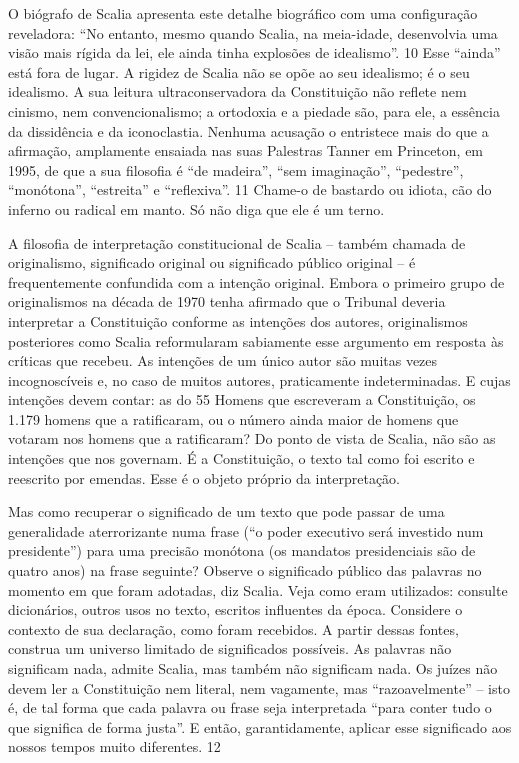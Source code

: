 \par
 
O biógrafo de Scalia apresenta este detalhe biográfico com uma configuração reveladora: “No entanto, mesmo quando Scalia, na meia-idade, desenvolvia uma visão mais rígida da lei, ele ainda tinha explosões de idealismo”.
 {\color{blue} 10}  
Esse “ainda” está fora de lugar. A rigidez de Scalia não se opõe ao seu idealismo; é o seu idealismo. A sua leitura ultraconservadora da Constituição não reflete nem cinismo, nem convencionalismo; a ortodoxia e a piedade são, para ele, a essência da dissidência e da iconoclastia. Nenhuma acusação o entristece mais do que a afirmação, amplamente ensaiada nas suas Palestras Tanner em Princeton, em 1995, de que a sua filosofia é “de madeira”, “sem imaginação”, “pedestre”, “monótona”, “estreita” e “reflexiva”.
 {\color{blue} 11}  
Chame-o de bastardo ou idiota, cão do inferno ou radical em manto. Só não diga que ele é um terno.
 
\par
 
A filosofia de interpretação constitucional de Scalia – também chamada de originalismo, significado original ou significado público original – é frequentemente confundida com a intenção original. Embora o primeiro grupo de originalismos na década de 1970 tenha afirmado que o Tribunal deveria interpretar a Constituição conforme as intenções dos autores, originalismos posteriores como Scalia reformularam sabiamente esse argumento em resposta às críticas que recebeu. As intenções de um único autor são muitas vezes incognoscíveis e, no caso de muitos autores, praticamente indeterminadas. E cujas intenções devem contar: as do
 {\color{blue} 55}  
Homens que escreveram a Constituição, os 1.179 homens que a ratificaram, ou o número ainda maior de homens que votaram nos homens que a ratificaram? Do ponto de vista de Scalia, não são as intenções que nos governam. É a Constituição, o texto tal como foi escrito e reescrito por emendas. Esse é o objeto próprio da interpretação.
 
\par
 
Mas como recuperar o significado de um texto que pode passar de uma generalidade aterrorizante numa frase (“o poder executivo será investido num presidente”) para uma precisão monótona (os mandatos presidenciais são de quatro anos) na frase seguinte? Observe o significado público das palavras no momento em que foram adotadas, diz Scalia. Veja como eram utilizados: consulte dicionários, outros usos no texto, escritos influentes da época. Considere o contexto de sua declaração, como foram recebidos. A partir dessas fontes, construa um universo limitado de significados possíveis. As palavras não significam nada, admite Scalia, mas também não significam nada. Os juízes não devem ler a Constituição nem literal, nem vagamente, mas “razoavelmente” – isto é, de tal forma que cada palavra ou frase seja interpretada “para conter tudo o que significa de forma justa”. E então, garantidamente, aplicar esse significado aos nossos tempos muito diferentes.
 {\color{blue} 12}  

